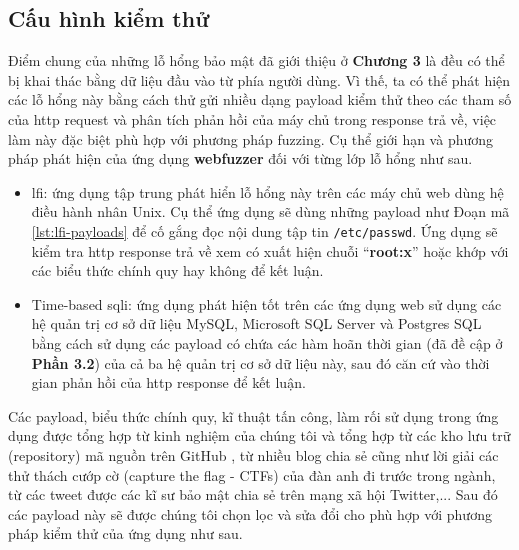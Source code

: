\subsection{Cấu hình kiểm thử}
Điểm chung của những lỗ hổng bảo mật đã giới thiệu ở \textbf{Chương 3} là đều có thể bị khai thác bằng dữ liệu đầu vào từ phía người dùng. Vì thế, ta có thể phát hiện các lỗ hổng này bằng cách thử gửi nhiều dạng payload kiểm thử theo các tham số của \acrshort{http} request và phân tích phản hồi của máy chủ trong response trả về, việc làm này đặc biệt phù hợp với phương pháp fuzzing. Cụ thể giới hạn và phương pháp phát hiện của ứng dụng \textbf{webfuzzer} đối với từng lớp lỗ hổng như sau.
\begin{itemize}
    \item \acrshort{lfi}: ứng dụng tập trung phát hiển lỗ hổng này trên các máy chủ web dùng hệ điều hành nhân Unix. Cụ thể ứng dụng sẽ dùng những payload như Đoạn mã \ref{lst:lfi-payloads} để cố gắng đọc nội dung tập tin \texttt{/etc/passwd}. Ứng dụng sẽ kiểm tra \acrshort{http} response trả về xem có xuất hiện chuỗi ``\textbf{root:x}'' hoặc khớp với các biểu thức chính quy hay không để kết luận.
    \item Time-based \acrshort{sqli}: ứng dụng phát hiện tốt trên các ứng dụng web sử dụng các hệ quản trị cơ sở dữ liệu MySQL, Microsoft SQL Server và Postgres SQL bằng cách sử dụng các payload có chứa các hàm hoãn thời gian (đã đề cập ở \textbf{Phần 3.2}) của cả ba hệ quản trị cơ sở dữ liệu này, sau đó căn cứ vào thời gian phản hồi của \acrshort{http} response để kết luận.
\end{itemize}
Các payload, biểu thức chính quy, kĩ thuật tấn công, làm rối sử dụng trong ứng dụng được tổng hợp từ kinh nghiệm của chúng tôi và tổng hợp từ các kho lưu trữ (repository) mã nguồn trên GitHub \parencite{seclist-fuzzing,0verpwn-fuzzing}, từ nhiều blog chia sẻ cũng như lời giải các thử thách cướp cờ (capture the flag - CTFs) của đàn anh đi trước trong ngành, từ các tweet được các kĩ sư bảo mật chia sẻ trên mạng xã hội Twitter,... Sau đó các payload này sẽ được chúng tôi chọn lọc và sửa đổi cho phù hợp với phương pháp kiểm thử của ứng dụng như sau.
